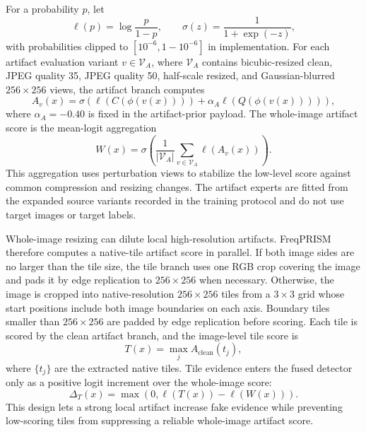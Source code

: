 \documentclass[lettersize,journal]{IEEEtran}
\begin{document}
For a probability $p$, let
\begin{equation}
    \ell(p)=\log \frac{p}{1-p}, \qquad
    \sigma(z)=\frac{1}{1+\exp(-z)},
\end{equation}
with probabilities clipped to $[10^{-6},1-10^{-6}]$ in implementation. For each artifact evaluation variant $v \in \mathcal{V}_{A}$, where $\mathcal{V}_{A}$ contains bicubic-resized clean, JPEG quality 35, JPEG quality 50, half-scale resized, and Gaussian-blurred $256 \times 256$ views, the artifact branch computes
\begin{equation}
    A_v(x)=\sigma\left(\ell(C(\phi(v(x))))+\alpha_A \ell(Q(\phi(v(x))))\right),
\end{equation}
where $\alpha_A=-0.40$ is fixed in the artifact-prior payload. The whole-image artifact score is the mean-logit aggregation
\begin{equation}
    W(x)=\sigma\left(\frac{1}{|\mathcal{V}_{A}|}\sum_{v\in\mathcal{V}_{A}}\ell(A_v(x))\right).
\end{equation}
This aggregation uses perturbation views to stabilize the low-level score against common compression and resizing changes. The artifact experts are fitted from the expanded source variants recorded in the training protocol and do not use target images or target labels.

Whole-image resizing can dilute local high-resolution artifacts. FreqPRISM therefore computes a native-tile artifact score in parallel. If both image sides are no larger than the tile size, the tile branch uses one RGB crop covering the image and pads it by edge replication to $256 \times 256$ when necessary. Otherwise, the image is cropped into native-resolution $256 \times 256$ tiles from a $3 \times 3$ grid whose start positions include both image boundaries on each axis. Boundary tiles smaller than $256 \times 256$ are padded by edge replication before scoring. Each tile is scored by the clean artifact branch, and the image-level tile score is
\begin{equation}
    T(x)=\max_{j} A_{\mathrm{clean}}(t_j),
\end{equation}
where $\{t_j\}$ are the extracted native tiles. Tile evidence enters the fused detector only as a positive logit increment over the whole-image score:
\begin{equation}
    \Delta_T(x)=\max\left(0,\ell(T(x))-\ell(W(x))\right).
\end{equation}
This design lets a strong local artifact increase fake evidence while preventing low-scoring tiles from suppressing a reliable whole-image artifact score.
\end{document}
